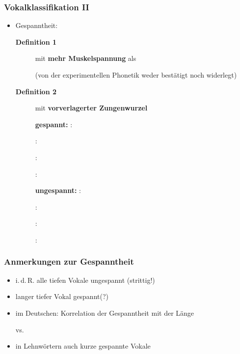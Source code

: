 \begin{frame}
\frametitle{Vokalklassifikation II}

\begin{itemize}
	\item Gespanntheit:

\begin{description}
	\item[\textbf{Definition 1}] \textipa{[ i:, y:, u:, o: ]} mit \textbf{mehr Muskelspannung} als \textipa{[ I, Y, U, O ]} 
	
	(von der experimentellen Phonetik weder bestätigt noch widerlegt)
	
	\item[\textbf{Definition 2}] \textipa{[ i:, y:, u:, o: ]}  mit \textbf{vorverlagerter Zungenwurzel}


\begin{multicols}{2}

\textbf{gespannt:}
	\ea \textipa{[ i: ]}: 
	
	\ex \textipa{[ y: ]}: 
	
	\ex \textipa{[ u: ]}: 
	
	\ex \textipa{[ o: ]}: 
	
	\z 
	
\columnbreak
	
\textbf{ungespannt:}
	\ea \textipa{[ I ]}: 
	
	\ex \textipa{[ Y ]}: 
	
	\ex \textipa{[ U ]}: 
	
	\ex \textipa{[ O ]}: 
	
	\z
	
\end{multicols}

\end{description}
\end{itemize}
			
\end{frame}		

			
\begin{frame}
\frametitle{Anmerkungen zur Gespanntheit}
		\begin{itemize}	
			\item i.\,d.\,R. alle tiefen Vokale \ras ungespannt (strittig!)
			\item langer tiefer Vokal \textipa{[ a: ]} \ras gespannt(?)

	      \item im Deutschen: Korrelation der Gespanntheit mit der Länge

		\ea \textipa{[ m i: t @ ]} vs. \textipa{[ m I t @ ]}
		\z

		\item in Lehnwörtern auch kurze gespannte Vokale

		\ea \textipa{[ P i . d e: ]}
		\z
		
	\end{itemize}
	
\end{frame}


